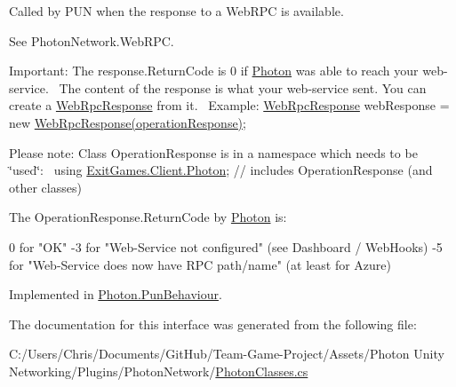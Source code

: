 Called by P\+UN when the response to a Web\+R\+PC is available. 

See Photon\+Network.\+Web\+R\+PC. 

Important\+: The response.\+Return\+Code is 0 if \hyperlink{namespace_photon}{Photon} was able to reach your web-\/service.~\newline
 The content of the response is what your web-\/service sent. You can create a \hyperlink{class_web_rpc_response}{Web\+Rpc\+Response} from it.~\newline
 Example\+: \hyperlink{class_web_rpc_response}{Web\+Rpc\+Response} web\+Response = new \hyperlink{class_web_rpc_response}{Web\+Rpc\+Response(operation\+Response)};~\newline


Please note\+: Class Operation\+Response is in a namespace which needs to be \char`\"{}used\char`\"{}\+:~\newline
 using \hyperlink{namespace_exit_games_1_1_client_1_1_photon}{Exit\+Games.\+Client.\+Photon}; // includes Operation\+Response (and other classes)

The Operation\+Response.\+Return\+Code by \hyperlink{namespace_photon}{Photon} is\+:
\begin{DoxyPre}
 0 for "OK"
-3 for "Web-Service not configured" (see Dashboard / WebHooks)
-5 for "Web-Service does now have RPC path/name" (at least for Azure)\end{DoxyPre}
 

Implemented in \hyperlink{class_photon_1_1_pun_behaviour_abddb6286cecb1409cbca26088328e86d}{Photon.\+Pun\+Behaviour}.



The documentation for this interface was generated from the following file\+:\begin{DoxyCompactItemize}
\item 
C\+:/\+Users/\+Chris/\+Documents/\+Git\+Hub/\+Team-\/\+Game-\/\+Project/\+Assets/\+Photon Unity Networking/\+Plugins/\+Photon\+Network/\hyperlink{_photon_classes_8cs}{Photon\+Classes.\+cs}\end{DoxyCompactItemize}
